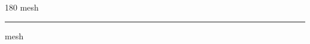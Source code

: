 
\begin{frame}
\begin{center}
\begin{turn}{180}
{\fontsize{2.5cm}{1em}\selectfont mesh}
\end{turn}
\vspace{1em}\par  
\hrule
\vspace{1em}\par  
{\fontsize{2.5cm}{1em}\selectfont mesh}
\end{center}
\end{frame}
